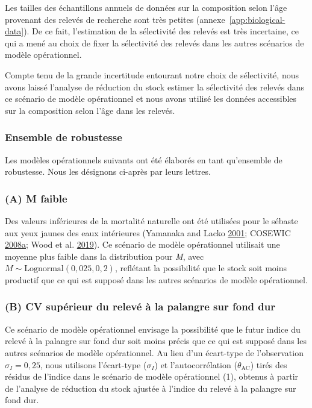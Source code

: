 \documentclass[11pt]{book}
\begin{document}
Les tailles des échantillons annuels de données sur la composition selon l'âge provenant des relevés de recherche sont très petites (annexe~\ref{app:biological-data}). De ce fait, l'estimation de la sélectivité des relevés est très incertaine, ce qui a mené au choix de fixer la sélectivité des relevés dans les autres scénarios de modèle opérationnel.

Compte tenu de la grande incertitude entourant notre choix de sélectivité, nous avons laissé l'analyse de réduction du stock estimer la sélectivité des relevés dans ce scénario de modèle opérationnel et nous avons utilisé les données accessibles sur la composition selon l'âge dans les relevés.

\hypertarget{sec:approach3-robustness}{%
\subsubsection{Ensemble de robustesse}\label{sec:approach3-robustness}}

Les modèles opérationnels suivants ont été élaborés en tant qu'ensemble de robustesse. Nous les désignons ci-après par leurs lettres.

\hypertarget{sec:approach3-referenceA}{%
\subsubsection{(A) M faible}\label{sec:approach3-referenceA}}

Des valeurs inférieures de la mortalité naturelle ont été utilisées pour le sébaste aux yeux jaunes des eaux intérieures (Yamanaka and Lacko \protect\hyperlink{ref-yamanaka2001}{2001}; COSEWIC \protect\hyperlink{ref-cosewic2008}{2008}\protect\hyperlink{ref-cosewic2008}{a}; Wood et al. \protect\hyperlink{ref-wood2019}{2019}). Ce scénario de modèle opérationnel utilisait une moyenne plus faible dans la distribution pour \emph{M}, avec \(M \sim \textrm{Lognormal}(0,025, 0,2)\), reflétant la possibilité que le stock soit moins productif que ce qui est supposé dans les autres scénarios de modèle opérationnel.

\hypertarget{sec:approach3-referenceB}{%
\subsubsection{(B) CV supérieur du relevé à la palangre sur fond dur}\label{sec:approach3-referenceB}}

Ce scénario de modèle opérationnel envisage la possibilité que le futur indice du relevé à la palangre sur fond dur soit moins précis que ce qui est supposé dans les autres scénarios de modèle opérationnel. Au lieu d'un écart-type de l'observation \(\sigma_I = 0,25\), nous utilisons l'écart-type (\(\sigma_I\)) et l'autocorrélation (\(\theta_\textrm{AC}\)) tirés des résidus de l'indice dans le scénario de modèle opérationnel (1), obtenus à partir de l'analyse de réduction du stock ajustée à l'indice du relevé à la palangre sur fond dur.
\end{document}
